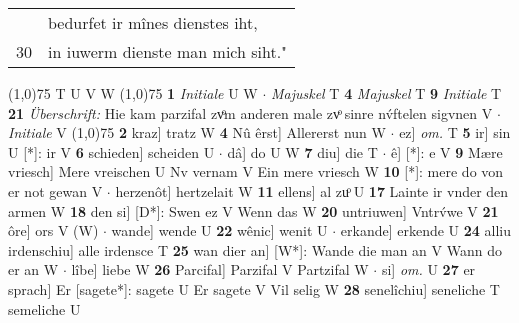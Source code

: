 \documentclass[8pt,a4paper,notitlepage]{article}
\begin{document}
\begin{table}[ht]
\begin{minipage}[t]{0.5\linewidth}
\begin{tabular}{rl}
 & bedurfet ir mînes dienstes iht,\\ 
30 & in iuwerm dienste man mich siht."\\ 
\end{tabular}
\scriptsize
\line(1,0){75} \newline
T U V W \newline
\line(1,0){75} \newline
\textbf{1} \textit{Initiale} U W   $\cdot$ \textit{Majuskel} T  \textbf{4} \textit{Majuskel} T  \textbf{9} \textit{Initiale} T  \textbf{21} \textit{Überschrift:} Hie kam parzifal zvͦm anderen male zvͦ sinre nv́ftelen sigvnen V   $\cdot$ \textit{Initiale} V  \newline
\line(1,0){75} \newline
\textbf{2} kraz] tratz W \textbf{4} Nû êrst] Allererst nun W  $\cdot$ ez] \textit{om.} T \textbf{5} ir] sin U [*]: ir V \textbf{6} schieden] scheiden U  $\cdot$ dâ] do U W \textbf{7} diu] die T  $\cdot$ ê] [*]: e V \textbf{9} Mære vriesch] Mere vreischen U Nv vernam V Ein mere vriesch W \textbf{10} [*]: mere do von er not gewan V  $\cdot$ herzenôt] hertzelait W \textbf{11} ellens] al zuͦ U \textbf{17} Lainte ir vnder den armen W \textbf{18} den si] [D*]: Swen ez V Wenn das W \textbf{20} untriuwen] Vntrv́we V \textbf{21} ôre] ors V (W)  $\cdot$ wande] wende U \textbf{22} wênic] wenit U  $\cdot$ erkande] erkende U \textbf{24} alliu irdenschiu] alle irdensce T \textbf{25} wan dier an] [W*]: Wande die man an V Wann do er an W  $\cdot$ lîbe] liebe W \textbf{26} Parcifal] Parzifal V Partzifal W  $\cdot$ si] \textit{om.} U \textbf{27} er sprach] Er [sagete*]: sagete U Er sagete V Vil selig W \textbf{28} senelîchiu] seneliche T semeliche U \newline
\end{minipage}
\end{table}
\end{document}
